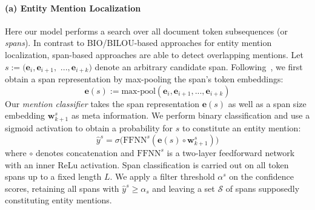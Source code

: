 \documentclass[11pt,a4paper]{article}
\begin{document}
\paragraph{(a) Entity Mention Localization} Here our model performs a search over all document token subsequences (or \emph{spans}). In contrast to BIO/BILOU-based approaches for entity mention localization, span-based approaches are able to detect overlapping mentions. Let $s := (\mathbf{e}_i, \mathbf{e}_{i+1},$ $ ..., \mathbf{e}_{i+k})$ denote an arbitrary candidate span. Following~\citet{eberts:2020:spert}, we first obtain a span representation by max-pooling the span's token embeddings: 
\begin{equation}
\label{eq:spanrepr}
\mathbf{e}(s) := \text{max-pool}(\mathbf{e}_i, \mathbf{e}_{i+1}, ..., \mathbf{e}_{i+k})
\end{equation}
Our \emph{mention classifier} takes the span representation $\mathbf{e}(s)$ as well as a span size embedding $\mathbf{w}_{k+1}^s$ \cite{lee:2017:span_coreference} as meta information. We perform binary classification and use a sigmoid activation to obtain a probability for $s$ to constitute an entity mention: 
\begin{equation}
\label{eq:spanclassifier}
\hat{y}^s = \sigma \Big(\text{FFNN}^s(\mathbf{e}(s) \circ \mathbf{w}_{k+1}^s) \Big)
\end{equation}
where $\circ$ denotes concatenation and $\text{FFNN}^s$ is a two-layer feedforward network with an inner ReLu activation.
Span classification is carried out on all token spans up to a fixed length $L$. We apply a filter threshold $\alpha^s$ on the confidence scores, retaining all spans with $\hat{y}^s	\geq \alpha_s$ and  leaving a set $\mathcal{S}$ of spans supposedly constituting entity mentions.
\end{document}
